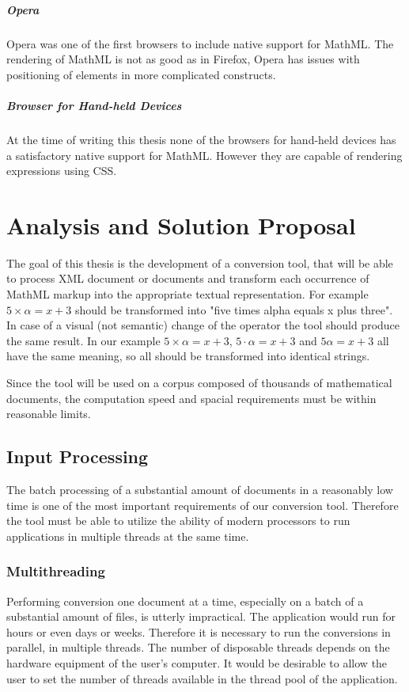 \documentclass[11pt,oneside,final]{fithesis2}
\begin{document}
\paragraph*{Opera}
Opera was one of the first browsers to include native support for MathML. The rendering of MathML is not as good as in Firefox, Opera has issues with positioning of elements in more complicated constructs. 

\paragraph*{Browser for Hand-held Devices}
At the time of writing this thesis none of the browsers for hand-held devices has a satisfactory native support for MathML. However they are capable of rendering expressions using CSS.

\chapter{Analysis and Solution Proposal}
The goal of this thesis is the development of a conversion tool, that will be able to process XML document or documents and transform each occurrence of MathML markup into the appropriate textual representation. For example $5 \times \alpha = x + 3$ should be transformed into "five times alpha equals x plus three". In case of a visual (not semantic) change of the operator the tool should produce the same result. In our example $5 \times \alpha = x + 3$, $5 \cdot \alpha = x + 3$ and $5\alpha = x + 3$ all have the same meaning, so all should be transformed into identical strings.

Since the tool will be used on a corpus composed of thousands of mathematical documents, the computation speed and spacial requirements must be within reasonable limits. 


\section{Input Processing}
The batch processing of a substantial amount of documents in a reasonably low time is one of the most important requirements of our conversion tool. Therefore the tool must be able to utilize the ability of modern processors to run applications in multiple threads at the same time. 

\subsection{Multithreading}
Performing conversion one document at a time, especially on a batch of a substantial amount of files, is utterly impractical. The application would run for hours or even days or weeks. Therefore it is necessary to run the conversions in parallel, in multiple threads. The number of disposable threads depends on the hardware equipment of the user's computer. It would be desirable to allow the user to set the number of threads available in the thread pool of the application.
\end{document}
